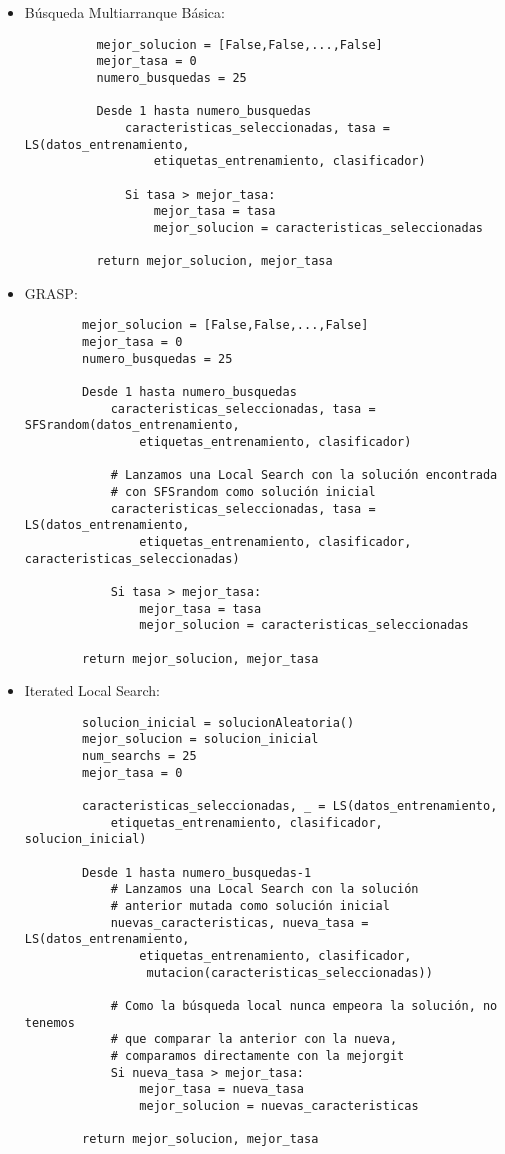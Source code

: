 \documentclass[a4paper, 11pt]{article}
\begin{document}
    \begin{itemize}
      \item Búsqueda Multiarranque Básica:
        \begin{verbatim}
          mejor_solucion = [False,False,...,False]
          mejor_tasa = 0
          numero_busquedas = 25

          Desde 1 hasta numero_busquedas
              caracteristicas_seleccionadas, tasa = LS(datos_entrenamiento,
                  etiquetas_entrenamiento, clasificador)

              Si tasa > mejor_tasa:
                  mejor_tasa = tasa
                  mejor_solucion = caracteristicas_seleccionadas

          return mejor_solucion, mejor_tasa
        \end{verbatim}
      \item GRASP:
      \begin{verbatim}
        mejor_solucion = [False,False,...,False]
        mejor_tasa = 0
        numero_busquedas = 25

        Desde 1 hasta numero_busquedas
            caracteristicas_seleccionadas, tasa = SFSrandom(datos_entrenamiento,
                etiquetas_entrenamiento, clasificador)

            # Lanzamos una Local Search con la solución encontrada
            # con SFSrandom como solución inicial
            caracteristicas_seleccionadas, tasa = LS(datos_entrenamiento,
                etiquetas_entrenamiento, clasificador, caracteristicas_seleccionadas)

            Si tasa > mejor_tasa:
                mejor_tasa = tasa
                mejor_solucion = caracteristicas_seleccionadas

        return mejor_solucion, mejor_tasa
      \end{verbatim}
      \item Iterated Local Search:
      \begin{verbatim}
        solucion_inicial = solucionAleatoria()
        mejor_solucion = solucion_inicial
        num_searchs = 25
        mejor_tasa = 0

        caracteristicas_seleccionadas, _ = LS(datos_entrenamiento,
            etiquetas_entrenamiento, clasificador, solucion_inicial)

        Desde 1 hasta numero_busquedas-1
            # Lanzamos una Local Search con la solución
            # anterior mutada como solución inicial
            nuevas_caracteristicas, nueva_tasa = LS(datos_entrenamiento,
                etiquetas_entrenamiento, clasificador,
                 mutacion(caracteristicas_seleccionadas))

            # Como la búsqueda local nunca empeora la solución, no tenemos
            # que comparar la anterior con la nueva,
            # comparamos directamente con la mejorgit
            Si nueva_tasa > mejor_tasa:
                mejor_tasa = nueva_tasa
                mejor_solucion = nuevas_caracteristicas

        return mejor_solucion, mejor_tasa
      \end{verbatim}
    \end{itemize}
\end{document}
